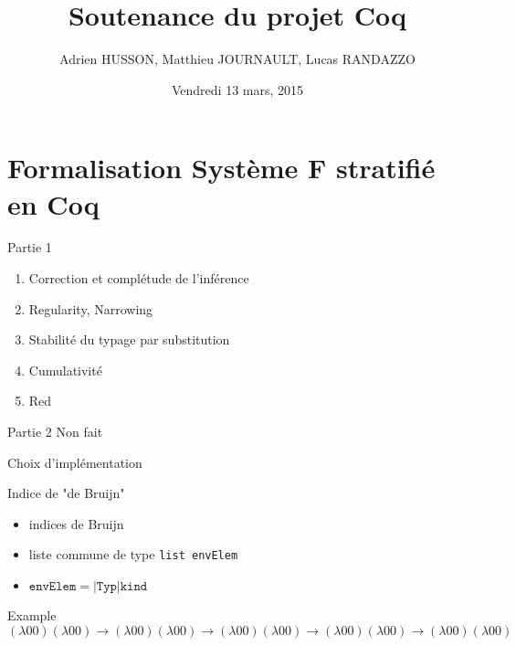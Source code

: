 \documentclass[10pt,xcolor={usenames,dvipsnames,svgnames,table}]{beamer}
\author{Adrien HUSSON, Matthieu JOURNAULT, Lucas RANDAZZO}
\date{Vendredi 13 mars, 2015}
\title{Soutenance du projet Coq}
\begin{document}
  \maketitle
  \begin{frame}
    \tableofcontents
  \end{frame}
  
  \section{Formalisation Système F stratifié en Coq}
  \begin{frame}
  \begin{block}{Partie 1}
  \begin{enumerate}
   \item Correction et complétude de l'inférence
   \item Regularity, Narrowing
   \item Stabilité du typage par substitution
   \item Cumulativité
   \item Red
  \end{enumerate}
  \end{block}
  \begin{alertblock}{Partie 2}
   Non fait
  \end{alertblock}
  \end{frame}
  \begin{frame}{Choix d'implémentation}
  \begin{block}{Indice de "de Bruijn"}
    \begin{itemize}
     \item indices de Bruijn
     \item liste commune de type \texttt{list envElem}
     \item $\texttt{envElem} = | \texttt{Typ} | \texttt{kind}$
    \end{itemize}

  \end{block}
  \begin{exampleblock}{Example}
   \[
    (\lambda 0 0)(\lambda 0 0) \rightarrow (\lambda 0 0)(\lambda 0 0) \rightarrow (\lambda 0 0)(\lambda 0 0) \rightarrow (\lambda 0 0)(\lambda 0 0) \rightarrow (\lambda 0 0)(\lambda 0 0) 
   \]
  \end{exampleblock}
  \end{frame}
\end{document}
